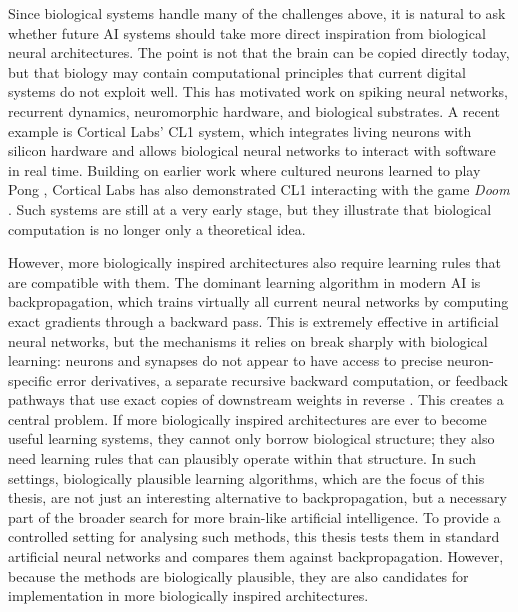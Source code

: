 Since biological systems handle many of the challenges above, it is natural to ask whether future AI systems should take more direct inspiration from biological neural architectures. The point is not that the brain can be copied directly today, but that biology may contain computational principles that current digital systems do not exploit well. This has motivated work on spiking neural networks, recurrent dynamics, neuromorphic hardware, and biological substrates. A recent example is Cortical Labs' CL1 system, which integrates living neurons with silicon hardware and allows biological neural networks to interact with software in real time. Building on earlier work where cultured neurons learned to play Pong \parencite{kagan_vitro_2022}, Cortical Labs has also demonstrated CL1 interacting with the game \emph{Doom} \parencite{noauthor_living_2026}. Such systems are still at a very early stage, but they illustrate that biological computation is no longer only a theoretical idea.

However, more biologically inspired architectures also require learning rules that are compatible with them. The dominant learning algorithm in modern AI is backpropagation, which trains virtually all current neural networks by computing exact gradients through a backward pass. This is extremely effective in artificial neural networks, but the mechanisms it relies on break sharply with biological learning: neurons and synapses do not appear to have access to precise neuron-specific error derivatives, a separate recursive backward computation, or feedback pathways that use exact copies of downstream weights in reverse \parencite{crick_recent_1989,lillicrap_backpropagation_2020}. This creates a central problem. If more biologically inspired architectures are ever to become useful learning systems, they cannot only borrow biological structure; they also need learning rules that can plausibly operate within that structure. In such settings, biologically plausible learning algorithms, which are the focus of this thesis, are not just an interesting alternative to backpropagation, but a necessary part of the broader search for more brain-like artificial intelligence. To provide a controlled setting for analysing such methods, this thesis tests them in standard artificial neural networks and compares them against backpropagation. However, because the methods are biologically plausible, they are also candidates for implementation in more biologically inspired architectures.

